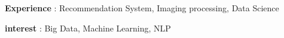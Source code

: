 
\begin{cventries}
  \textbf{Experience} : Recommendation System, Imaging processing, Data Science

  \textbf{interest} : Big Data, Machine Learning, NLP

\end{cventries}
